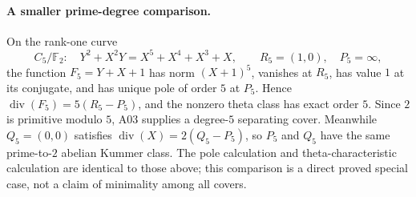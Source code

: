 \paragraph{A smaller prime-degree comparison.}
On the rank-one curve
\[
 C_5/\mathbb F_2:\quad
 Y^2+X^2Y=X^5+X^4+X^3+X,
 \qquad R_5=(1,0),\quad P_5=\infty,
\]
the function $F_5=Y+X+1$ has norm $(X+1)^5$, vanishes at $R_5$,
has value $1$ at its conjugate, and has unique pole of order $5$
at $P_5$. Hence $\operatorname{div}(F_5)=5(R_5-P_5)$, and the
nonzero theta class has exact order $5$. Since $2$ is primitive
modulo $5$, A03 supplies a degree-$5$ separating cover. Meanwhile
$Q_5=(0,0)$ satisfies $\operatorname{div}(X)=2(Q_5-P_5)$, so
$P_5$ and $Q_5$ have the same prime-to-$2$ abelian Kummer class.
The pole calculation and theta-characteristic calculation are
identical to those above; this comparison is a direct proved
special case, not a claim of minimality among all covers.

